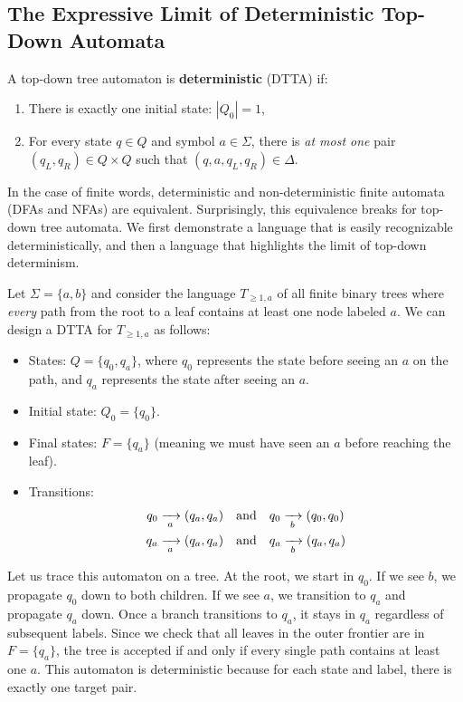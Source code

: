 \subsection{The Expressive Limit of Deterministic Top-Down Automata}
A top-down tree automaton is \textbf{deterministic} (DTTA) if:
\begin{enumerate}
    \item There is exactly one initial state: $|Q_0| = 1$,
    \item For every state $q \in Q$ and symbol $a \in \Sigma$, there is \emph{at most one} pair $(q_L, q_R) \in Q \times Q$ such that $(q, a, q_L, q_R) \in \Delta$.
\end{enumerate}

In the case of finite words, deterministic and non-deterministic finite automata (DFAs and NFAs) are equivalent. Surprisingly, this equivalence breaks for top-down tree automata. We first demonstrate a language that is easily recognizable deterministically, and then a language that highlights the limit of top-down determinism.

\begin{example}
Let $\Sigma = \{a, b\}$ and consider the language $T_{\ge 1, a}$ of all finite binary trees where \emph{every} path from the root to a leaf contains at least one node labeled $a$.
We can design a DTTA for $T_{\ge 1, a}$ as follows:
\begin{itemize}
    \item States: $Q = \{q_0, q_a\}$, where $q_0$ represents the state before seeing an $a$ on the path, and $q_a$ represents the state after seeing an $a$.
    \item Initial state: $Q_0 = \{q_0\}$.
    \item Final states: $F = \{q_a\}$ (meaning we must have seen an $a$ before reaching the leaf).
    \item Transitions:
    \begin{align*}
        q_0 \xrightarrow[{\;a\;}]{} (q_a, q_a) & \quad \text{and} \quad q_0 \xrightarrow[{\;b\;}]{} (q_0, q_0) \\
        q_a \xrightarrow[{\;a\;}]{} (q_a, q_a) & \quad \text{and} \quad q_a \xrightarrow[{\;b\;}]{} (q_a, q_a)
    \end{align*}
\end{itemize}
Let us trace this automaton on a tree. At the root, we start in $q_0$. If we see $b$, we propagate $q_0$ down to both children. If we see $a$, we transition to $q_a$ and propagate $q_a$ down. Once a branch transitions to $q_a$, it stays in $q_a$ regardless of subsequent labels. Since we check that all leaves in the outer frontier are in $F = \{q_a\}$, the tree is accepted if and only if every single path contains at least one $a$. This automaton is deterministic because for each state and label, there is exactly one target pair.
\end{example}

